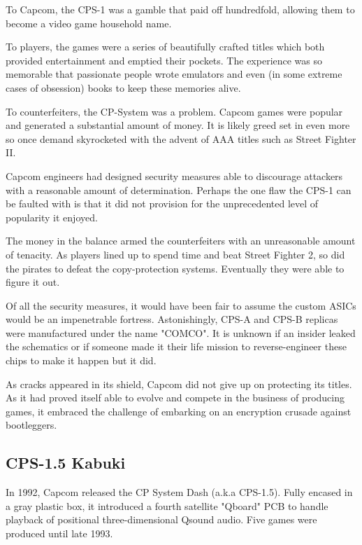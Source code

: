 To Capcom, the CPS-1 was a gamble that paid off hundredfold, allowing them to become a video game household name. 

To players, the games were a series of beautifully crafted titles which both provided entertainment and emptied their pockets. The experience was so memorable that passionate people wrote emulators and even (in some extreme cases of obsession) books to keep these memories alive. 

To counterfeiters, the CP-System was a problem. Capcom games were popular and generated a substantial amount of money. It is likely greed set in even more so once demand skyrocketed with the advent of AAA titles such as Street Fighter II. 

Capcom engineers had designed security measures able to discourage attackers with a reasonable amount of determination. Perhaps the one flaw the CPS-1 can be faulted with is that it did not provision for the unprecedented level of popularity it enjoyed.

The money in the balance armed the counterfeiters with an unreasonable amount of tenacity. As players lined up to spend time and beat Street Fighter 2, so did the pirates to defeat the copy-protection systems. Eventually they were able to figure it out. 


Of all the security measures, it would have been fair to assume the custom ASICs would be an impenetrable fortress. Astonishingly, CPS-A and CPS-B replicas were manufactured under the name "COMCO"\cite{arcadeHackerCPS1}. It is unknown if an insider leaked the schematics or if someone made it their life mission to reverse-engineer these chips to make it happen but it did.

As cracks appeared in its shield, Capcom did not give up on protecting its titles. As it had proved itself able to evolve and compete in the business of producing games, it embraced the challenge of embarking on an encryption crusade against bootleggers.

\subsection{CPS-1.5 Kabuki}
In 1992, Capcom released the CP System Dash (a.k.a CPS-1.5). Fully encased in a gray plastic box, it introduced a fourth satellite "Qboard" PCB to handle playback of positional three-dimensional Qsound audio. Five games were produced until late 1993.


